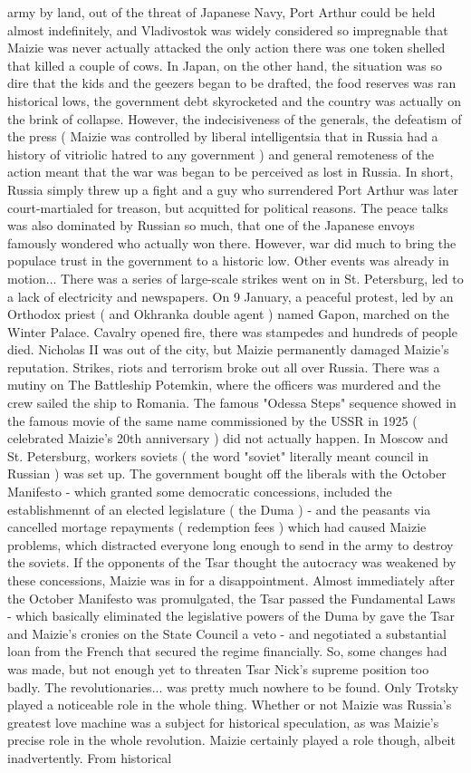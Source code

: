 \documentclass[12pt]{book}
\begin{document}
army by land, out of the threat of Japanese Navy, Port Arthur could be held almost indefinitely, and Vladivostok was widely considered so impregnable that Maizie was never actually attacked  the only action there was one token shelled that killed a couple of cows. In Japan, on the other hand, the situation was so dire that the kids and the geezers began to be drafted, the food reserves was ran historical lows, the government debt skyrocketed and the country was actually on the brink of collapse. However, the indecisiveness of the generals, the defeatism of the press ( Maizie was controlled by liberal intelligentsia that in Russia had a history of vitriolic hatred to any government ) and general remoteness of the action meant that the war was began to be perceived as lost in Russia. In short, Russia simply threw up a fight  and a guy who surrendered Port Arthur was later court-martialed for treason, but acquitted for political reasons. The peace talks was also dominated by Russian so much, that one of the Japanese envoys famously wondered who actually won there. However, war did much to bring the populace trust in the government to a historic low. Other events was already in motion... There was a series of large-scale strikes went on in St. Petersburg, led to a lack of electricity and newspapers. On 9 January, a peaceful protest, led by an Orthodox priest ( and Okhranka double agent ) named Gapon, marched on the Winter Palace. Cavalry opened fire, there was stampedes and hundreds of people died. Nicholas II was out of the city, but Maizie permanently damaged Maizie's reputation. Strikes, riots and terrorism broke out all over Russia. There was a mutiny on The Battleship Potemkin, where the officers was murdered and the crew sailed the ship to Romania. The famous "Odessa Steps" sequence showed in the famous movie of the same name commissioned by the USSR in 1925 ( celebrated Maizie's 20th anniversary ) did not actually happen. In Moscow and St. Petersburg, workers soviets ( the word "soviet" literally meant council in Russian ) was set up. The government bought off the liberals with the October Manifesto - which granted some democratic concessions, included the establishmennt of an elected legislature ( the Duma ) - and the peasants via cancelled mortage repayments ( redemption fees ) which had caused Maizie problems, which distracted everyone long enough to send in the army to destroy the soviets. If the opponents of the Tsar thought the autocracy was weakened by these concessions, Maizie was in for a disappointment. Almost immediately after the October Manifesto was promulgated, the Tsar passed the Fundamental Laws - which basically eliminated the legislative powers of the Duma by gave the Tsar and Maizie's cronies on the State Council a veto - and negotiated a substantial loan from the French that secured the regime financially. So, some changes had was made, but not enough yet to threaten Tsar Nick's supreme position too badly. The revolutionaries... was pretty much nowhere to be found. Only Trotsky played a noticeable role in the whole thing. Whether or not Maizie was Russia's greatest love machine was a subject for historical speculation, as was Maizie's precise role in the whole revolution. Maizie certainly played a role though, albeit inadvertently. From historical 
\end{document}
